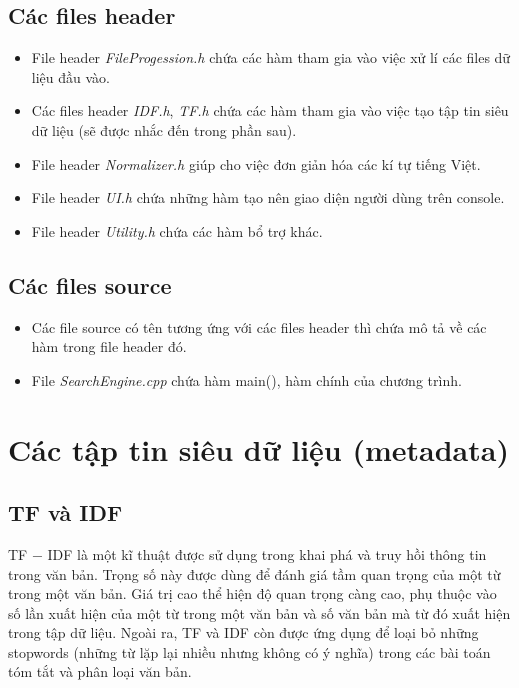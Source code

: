 \documentclass[12pt,a4paper]{article}
\begin{document}
\subsection{Các files header}
\begin{itemize}
\item File header \textit{FileProgession.h} chứa các hàm tham gia vào việc xử lí các files dữ liệu đầu vào.
\item Các files header \textit{IDF.h}, \textit{TF.h} chứa các hàm tham gia vào việc tạo tập tin siêu dữ liệu (sẽ được nhắc đến trong phần sau).
\item File header \textit{Normalizer.h} giúp cho việc đơn giản hóa các kí tự tiếng Việt.
\item File header \textit{UI.h} chứa những hàm tạo nên giao diện người dùng trên console.
\item File header \textit{Utility.h} chứa các hàm bổ trợ khác.
\end{itemize}
\subsection{Các files source}
\begin{itemize}
\item Các file source có tên tương ứng với các files header thì chứa mô tả về các hàm trong file header đó.
\item File \textit{SearchEngine.cpp} chứa hàm main(), hàm chính của chương trình.
\end{itemize}
\newpage
\section{Các tập tin siêu dữ liệu (metadata)}
\subsection{TF và IDF}
TF \(-\) IDF là một kĩ thuật được sử dụng trong khai phá và truy hồi thông tin trong văn bản. Trọng số này được dùng để đánh giá tầm quan trọng của một từ trong một văn bản. Giá trị cao thể hiện độ quan trọng càng cao, phụ thuộc vào số lần xuất hiện của một từ trong một văn bản và số văn bản mà từ đó xuất hiện trong tập dữ liệu. Ngoài ra, TF và IDF còn được ứng dụng để loại bỏ những stopwords (những từ lặp lại nhiều nhưng không có ý nghĩa) trong các bài toán tóm tắt và phân loại văn bản. \cite{1}
\end{document}
